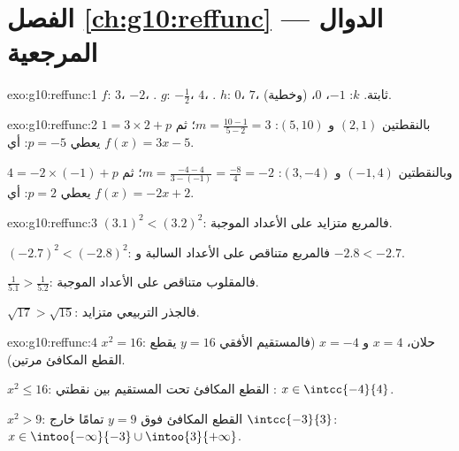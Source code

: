 \section*{الفصل \ref{ch:g10:reffunc} --- الدوال المرجعية}

\begin{solution}{exo:g10:reffunc:1}
$f$:  $3$،  $-2$، . \quad
$g$:  $-\frac12$،  $4$، . \quad
$h$:  $0$،  $7$، ثابتة. \quad
$k$:  $-1$،  $0$،  (وخطية).
\end{solution}

\begin{solution}{exo:g10:reffunc:2}
بالنقطتين $(2,1)$ و $(5,10)$:  $m = \frac{10 - 1}{5 - 2} = 3$؛ ثم
$1 = 3 \times 2 + p$ يعطي $p = -5$: أي $f(x) = 3x - 5$.

وبالنقطتين $(-1,4)$ و $(3,-4)$:  $m = \frac{-4 - 4}{3 - (-1)} =
\frac{-8}{4} = -2$؛ ثم $4 = -2 \times (-1) + p$ يعطي $p = 2$:
أي $f(x) = -2x + 2$.
\end{solution}

\begin{solution}{exo:g10:reffunc:3}
$(3.1)^2 < (3.2)^2$: فالمربع متزايد على الأعداد الموجبة.

$(-2.7)^2 < (-2.8)^2$: فالمربع متناقص على الأعداد السالبة و
$-2.8 < -2.7$.

$\frac{1}{5.1} > \frac{1}{5.2}$: فالمقلوب متناقص على الأعداد الموجبة.

$\sqrt{17} > \sqrt{15}$: فالجذر التربيعي متزايد.
\end{solution}

\begin{solution}{exo:g10:reffunc:4}
$x^2 = 16$: حلان، $x = 4$ و $x = -4$ (فالمستقيم الأفقي
$y = 16$ يقطع القطع المكافئ مرتين).

$x^2 \leq 16$: القطع المكافئ تحت المستقيم بين نقطتي
: $x \in \intcc{-4}{4}$.

$x^2 > 9$: القطع المكافئ فوق $y = 9$ تمامًا خارج
$\intcc{-3}{3}$: $x \in \intoo{-\infty}{-3} \cup \intoo{3}{+\infty}$.
\end{solution}

